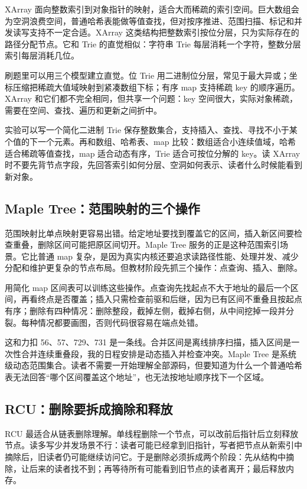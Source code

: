 XArray 面向整数索引到对象指针的映射，适合大而稀疏的索引空间。巨大数组会为空洞浪费空间，普通哈希表能做等值查找，但对按序推进、范围扫描、标记和并发读写支持不一定合适。XArray 这类结构把整数索引按位分层，只为实际存在的路径分配节点。它和 Trie 的直觉相似：字符串 Trie 每层消耗一个字符，整数分层索引每层消耗几位。

刷题里可以用三个模型建立直觉。位 Trie 用二进制位分层，常见于最大异或；坐标压缩把稀疏大值域映射到紧凑数组下标；有序 map 支持稀疏 key 的顺序遍历。XArray 和它们都不完全相同，但共享一个问题：key 空间很大，实际对象稀疏，需要在空间、查找、遍历和更新之间折中。

实验可以写一个简化二进制 Trie 保存整数集合，支持插入、查找、寻找不小于某个值的下一个元素。再和数组、哈希表、map 比较：数组适合小连续值域，哈希适合稀疏等值查找，map 适合动态有序，Trie 适合可按位分解的 key。读 XArray 时不要先背节点字段，先回答索引如何分层、空洞如何表示、读者什么时候能看到新对象。

\subsection{Maple Tree：范围映射的三个操作}

范围映射比单点映射更容易出错。给定地址要找到覆盖它的区间，插入新区间要检查重叠，删除区间可能把原区间切开。Maple Tree 服务的正是这种范围索引场景。它比普通 map 复杂，是因为真实内核还要追求读路径性能、处理并发、减少分配和维护更复杂的节点布局。但教材阶段先抓三个操作：点查询、插入、删除。

用简化 map 区间表可以训练这些操作。点查询先找起点不大于地址的最后一个区间，再看终点是否覆盖；插入只需检查前驱和后继，因为已有区间不重叠且按起点有序；删除有四种情况：删除整段，截掉左侧，截掉右侧，从中间挖掉一段并分裂。每种情况都要画图，否则代码很容易在端点处错。

这和力扣 56、57、729、731 是一条线。合并区间是离线排序扫描，插入区间是一次性合并连续重叠段，我的日程安排是动态插入并检查冲突。Maple Tree 是系统级动态范围集合。读者不需要一开始理解全部源码，但要知道为什么一个普通哈希表无法回答“哪个区间覆盖这个地址”，也无法按地址顺序找下一个区域。

\subsection{RCU：删除要拆成摘除和释放}

RCU 最适合从链表删除理解。单线程删除一个节点，可以改前后指针后立刻释放节点。读多写少并发场景不行：读者可能已经拿到旧指针，写者把节点从新索引中摘除后，旧读者仍可能继续访问它。于是删除必须拆成两个阶段：先从结构中摘除，让后来的读者找不到；再等待所有可能看到旧节点的读者离开；最后释放内存。

